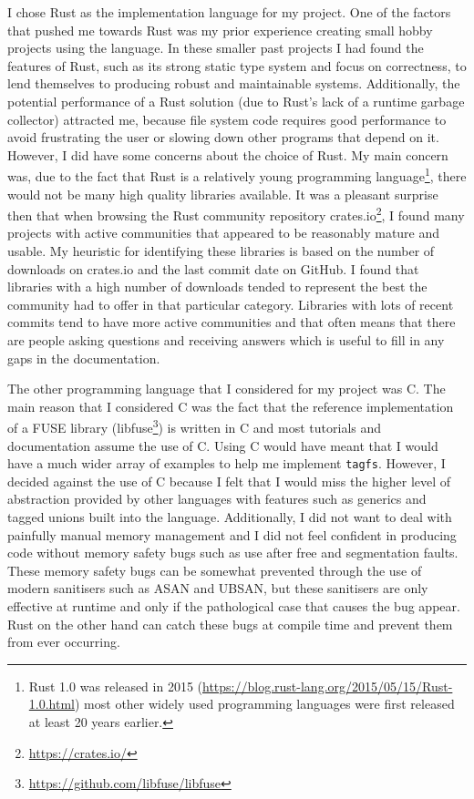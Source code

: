 I chose Rust as the implementation language for my project. One of the factors
that pushed me towards Rust was my prior experience creating small hobby
projects using the language. In these smaller past projects I had found the
features of Rust, such as its strong static type system and focus on
correctness, to lend themselves to producing robust and maintainable systems.
Additionally, the potential performance of a Rust solution (due to Rust's lack
of a runtime garbage collector) attracted me, because file system code requires
good performance to avoid frustrating the user or slowing down other programs
that depend on it. However, I did have some concerns about the choice of Rust.
My main concern was, due to the fact that Rust is a relatively young
programming language\footnote{Rust 1.0 was released in 2015
(\url{https://blog.rust-lang.org/2015/05/15/Rust-1.0.html}) most other widely
used programming languages were first released at least 20 years earlier.},
there would not be many high quality libraries available. It was a pleasant
surprise then that when browsing the Rust community repository
crates.io\footnote{\url{https://crates.io/}}, I found many projects with active
communities that appeared to be reasonably mature and usable. My heuristic for
identifying these libraries is based on the number of downloads on crates.io
and the last commit date on GitHub. I found that libraries with a high number
of downloads tended to represent the best the community had to offer in that
particular category. Libraries with lots of recent commits tend to have more
active communities and that often means that there are people asking questions
and receiving answers which is useful to fill in any gaps in the documentation.

The other programming language that I considered for my project was C. The main
reason that I considered C was the fact that the reference implementation of a
FUSE library (libfuse\footnote{\url{https://github.com/libfuse/libfuse}}) is
written in C and most tutorials and documentation assume the use of C. Using C
would have meant that I would have a much wider array of examples to help me
implement \texttt{tagfs}. However, I decided against the use of C because I
felt that I would miss the higher level of abstraction provided by other
languages with features such as generics and tagged unions built into the
language. Additionally, I did not want to deal with painfully manual memory
management and I did not feel confident in producing code without memory
safety bugs such as use after free and segmentation faults. These memory safety
bugs can be somewhat prevented through the use of modern sanitisers such as
ASAN and UBSAN, but these sanitisers are only effective at runtime and only if
the pathological case that causes the bug appear. Rust on the other hand can
catch these bugs at compile time and prevent them from ever occurring.


